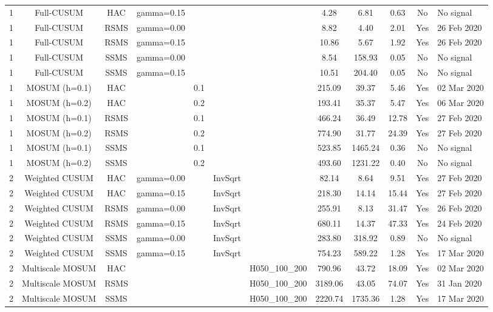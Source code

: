 \begin{table}[htbp]
\begin{tabular}{cccccccccccl}
1 & Full-CUSUM & HAC & gamma=0.15 &  &  &  & 4.28 & 6.81 & 0.63 & No & No signal \\
1 & Full-CUSUM & RSMS & gamma=0.00 &  &  &  & 8.82 & 4.40 & 2.01 & Yes & 26 Feb 2020 \\
1 & Full-CUSUM & RSMS & gamma=0.15 &  &  &  & 10.86 & 5.67 & 1.92 & Yes & 26 Feb 2020 \\
1 & Full-CUSUM & SSMS & gamma=0.00 &  &  &  & 8.54 & 158.93 & 0.05 & No & No signal \\
1 & Full-CUSUM & SSMS & gamma=0.15 &  &  &  & 10.51 & 204.40 & 0.05 & No & No signal \\
1 & MOSUM (h=0.1) & HAC &  & 0.1 &  &  & 215.09 & 39.37 & 5.46 & Yes & 02 Mar 2020 \\
1 & MOSUM (h=0.2) & HAC &  & 0.2 &  &  & 193.41 & 35.37 & 5.47 & Yes & 06 Mar 2020 \\
1 & MOSUM (h=0.1) & RSMS &  & 0.1 &  &  & 466.24 & 36.49 & 12.78 & Yes & 27 Feb 2020 \\
1 & MOSUM (h=0.2) & RSMS &  & 0.2 &  &  & 774.90 & 31.77 & 24.39 & Yes & 27 Feb 2020 \\
1 & MOSUM (h=0.1) & SSMS &  & 0.1 &  &  & 523.85 & 1465.24 & 0.36 & No & No signal \\
1 & MOSUM (h=0.2) & SSMS &  & 0.2 &  &  & 493.60 & 1231.22 & 0.40 & No & No signal \\
2 & Weighted CUSUM & HAC & gamma=0.00 &  & InvSqrt &  & 82.14 & 8.64 & 9.51 & Yes & 27 Feb 2020 \\
2 & Weighted CUSUM & HAC & gamma=0.15 &  & InvSqrt &  & 218.30 & 14.14 & 15.44 & Yes & 27 Feb 2020 \\
2 & Weighted CUSUM & RSMS & gamma=0.00 &  & InvSqrt &  & 255.91 & 8.13 & 31.47 & Yes & 26 Feb 2020 \\
2 & Weighted CUSUM & RSMS & gamma=0.15 &  & InvSqrt &  & 680.11 & 14.37 & 47.33 & Yes & 24 Feb 2020 \\
2 & Weighted CUSUM & SSMS & gamma=0.00 &  & InvSqrt &  & 283.80 & 318.92 & 0.89 & No & No signal \\
2 & Weighted CUSUM & SSMS & gamma=0.15 &  & InvSqrt &  & 754.23 & 589.22 & 1.28 & Yes & 17 Mar 2020 \\
2 & Multiscale MOSUM & HAC &  &  &  & H050_100_200 & 790.96 & 43.72 & 18.09 & Yes & 02 Mar 2020 \\
2 & Multiscale MOSUM & RSMS &  &  &  & H050_100_200 & 3189.06 & 43.05 & 74.07 & Yes & 31 Jan 2020 \\
2 & Multiscale MOSUM & SSMS &  &  &  & H050_100_200 & 2220.74 & 1735.36 & 1.28 & Yes & 17 Mar 2020 \\

\end{tabular}
\end{table}
